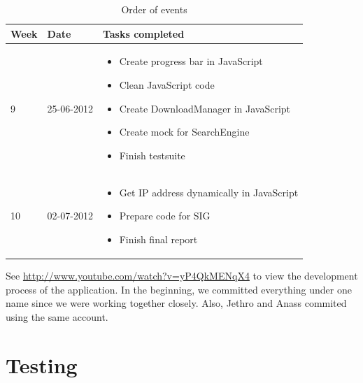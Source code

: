 \begin{table}
\centering
	\begin{tabular}{| l | l | p{8 cm} |}
		\hline
		Week & Date & Tasks completed \\
		\hline
		\hline
		9 & 25-06-2012 &		\begin{itemize}
								\item Create progress bar in JavaScript
								\item Clean JavaScript code
								\item Create DownloadManager in JavaScript
								\item Create mock for SearchEngine
								\item Finish testsuite
							\end{itemize} \\
		\hline
		10 & 02-07-2012 &	\begin{itemize}
								\item Get IP address dynamically in JavaScript
								\item Prepare code for SIG
								\item Finish final report
							\end{itemize} \\
		\hline
\end{tabular}
\caption{Order of events}
\label{tab:planning3}
\end{table}

See \url{http://www.youtube.com/watch?v=yP4QkMENqX4} to view the development process of the application. In the beginning, we committed everything under one name since we were working together closely. Also, Jethro and Anass commited using the same account.

\section{Testing}

